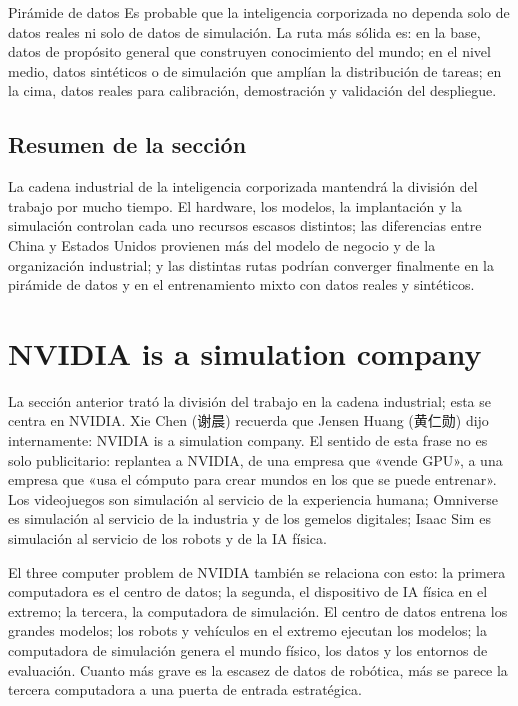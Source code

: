 \documentclass[a4paper]{article}
\begin{document}
\begin{importantbox}{Pirámide de datos}
Es probable que la inteligencia corporizada no dependa solo de datos reales ni solo de datos de simulación. La ruta más sólida es: en la base, datos de propósito general que construyen conocimiento del mundo; en el nivel medio, datos sintéticos o de simulación que amplían la distribución de tareas; en la cima, datos reales para calibración, demostración y validación del despliegue.
\end{importantbox}

\subsection{Resumen de la sección}

La cadena industrial de la inteligencia corporizada mantendrá la división del trabajo por mucho tiempo. El hardware, los modelos, la implantación y la simulación controlan cada uno recursos escasos distintos; las diferencias entre China y Estados Unidos provienen más del modelo de negocio y de la organización industrial; y las distintas rutas podrían converger finalmente en la pirámide de datos y en el entrenamiento mixto con datos reales y sintéticos.
\section{NVIDIA is a simulation company}

La sección anterior trató la división del trabajo en la cadena industrial; esta se centra en NVIDIA. Xie Chen (谢晨) recuerda que Jensen Huang (黄仁勋) dijo internamente: NVIDIA is a simulation company. El sentido de esta frase no es solo publicitario: replantea a NVIDIA, de una empresa que «vende GPU», a una empresa que «usa el cómputo para crear mundos en los que se puede entrenar». Los videojuegos son simulación al servicio de la experiencia humana; Omniverse es simulación al servicio de la industria y de los gemelos digitales; Isaac Sim es simulación al servicio de los robots y de la IA física.

El three computer problem de NVIDIA también se relaciona con esto: la primera computadora es el centro de datos; la segunda, el dispositivo de IA física en el extremo; la tercera, la computadora de simulación. El centro de datos entrena los grandes modelos; los robots y vehículos en el extremo ejecutan los modelos; la computadora de simulación genera el mundo físico, los datos y los entornos de evaluación. Cuanto más grave es la escasez de datos de robótica, más se parece la tercera computadora a una puerta de entrada estratégica.
\end{document}
